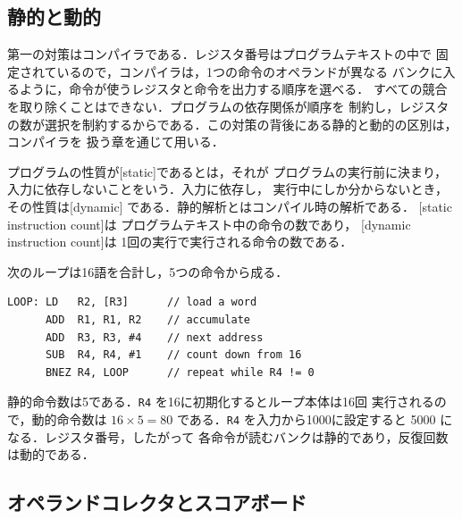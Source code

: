 \documentclass[../main.tex]{subfiles}
\begin{document}
\subsection{静的と動的}

第一の対策はコンパイラである．レジスタ番号はプログラムテキストの中で
固定されているので，コンパイラは，1つの命令のオペランドが異なる
バンクに入るように，命令が使うレジスタと命令を出力する順序を選べる．
すべての競合を取り除くことはできない．プログラムの依存関係が順序を
制約し，レジスタの数が選択を制約するからである．この対策の背後にある静的と動的の区別は，コンパイラを
扱う章を通じて用いる．

\begin{definition}[静的と動的]
  \label{def:l04-static-dynamic}
  プログラムの性質が[static]であるとは，それが
  プログラムの実行前に決まり，入力に依存しないことをいう．入力に依存し，
  実行中にしか分からないとき，その性質は[dynamic]
  である．静的解析とはコンパイル時の解析である．
  [static instruction count]は
  プログラムテキスト中の命令の数であり，
  [dynamic instruction count]は
  1回の実行で実行される命令の数である．
\end{definition}

\begin{example}
  \label{ex:l04-static-dynamic}
  次のループは16語を合計し，5つの命令から成る．
\begin{lstlisting}[numbers=none]
LOOP: LD   R2, [R3]      // load a word
      ADD  R1, R1, R2    // accumulate
      ADD  R3, R3, #4    // next address
      SUB  R4, R4, #1    // count down from 16
      BNEZ R4, LOOP      // repeat while R4 != 0
\end{lstlisting}
  静的命令数は5である．\texttt{R4} を16に初期化するとループ本体は16回
  実行されるので，動的命令数は $16 \times 5 = 80$ である．\texttt{R4}
  を入力から1000に設定すると \num{5000} になる．レジスタ番号，したがって
  各命令が読むバンクは静的であり，反復回数は動的である．
\end{example}

\subsection{オペランドコレクタとスコアボード}
\end{document}
